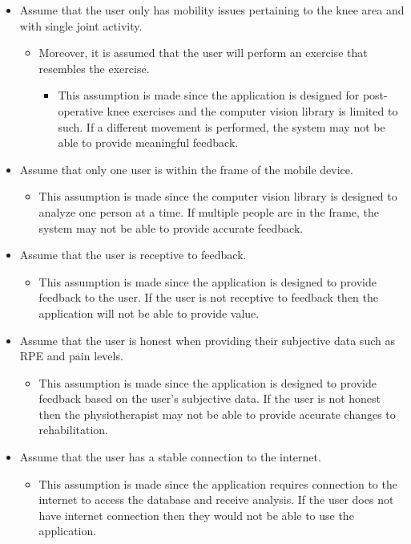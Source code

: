 \documentclass{article}
\begin{document}
\begin{itemize}
    \item Assume that the user only has mobility issues pertaining to the knee area and with single joint activity.
    \begin{itemize}
        \item Moreover, it is assumed that the user will perform an exercise that resembles the exercise.
        \begin{itemize}
        \item This assumption is made since the application is designed for post-operative knee exercises and the computer vision library is limited to such. If a different movement is performed, the system may not be able to provide meaningful feedback.
        \end{itemize}
    \end{itemize}
    \item Assume that only one user is within the frame of the mobile device.
    \begin{itemize}
        \item This assumption is made since the computer vision library is designed to analyze one person at a time. If multiple people are in the frame, the system may not be able to provide accurate feedback.
    \end{itemize}
    \item Assume that the user is receptive to feedback.
    \begin{itemize}
        \item This assumption is made since the application is designed to provide feedback to the user. If the user is not receptive to feedback then the application will not be able to provide value.
    \end{itemize}
    \item Assume that the user is honest when providing their subjective data such as RPE and pain levels.
    \begin{itemize}
        \item This assumption is made since the application is designed to provide feedback based on the user's subjective data. If the user is not honest then the physiotherapist may not be able to provide accurate changes to rehabilitation.
    \end{itemize}
    \item Assume that the user has a stable connection to the internet.
    \begin{itemize}
        \item This assumption is made since the application requires connection to the internet to access the database and receive analysis. If the user does not have internet connection then they would not be able to use the application.

\end{itemize}
\end{itemize}
\end{document}
